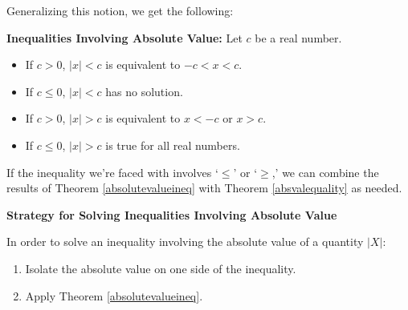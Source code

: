 \documentclass{ximera}
\begin{document}
Generalizing this notion, we get the following:

 

\begin{theorem}  \label{absolutevalueineq} \textbf{Inequalities Involving Absolute Value:}  Let $c$ be a real number.  

\begin{itemize}

\item   If $c> 0$, $|x| < c$ is equivalent to $-c<x<c$.

\item  If $c \leq 0$, $|x| < c$ has no solution.

\item  If $c > 0$, $|x| > c$ is equivalent to $x < -c$ or $x > c$.

\item If $c \leq 0$, $|x| > c$ is true for all real numbers.

\end{itemize}

\end{theorem}

 

If the inequality we're faced with involves `$\leq$' or `$\geq$,' we can combine the results of Theorem \ref{absolutevalueineq}  with Theorem \ref{absvalequality} as needed. 

 

 
\label{strategyforsolvingabsineq}


\centerline{\textbf{Strategy for Solving Inequalities Involving  Absolute Value}}


In order to solve an inequality involving the absolute value of a quantity $|X|$:

\begin{enumerate}

\item  Isolate the absolute value on one side of the inequality.

\item  Apply Theorem \ref{absolutevalueineq}.

\end{enumerate}

\end{document}
